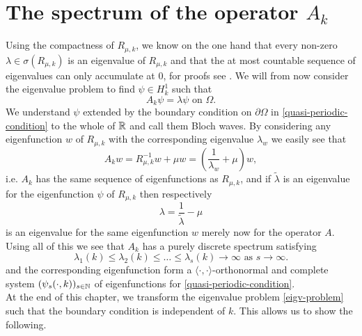 \section{The spectrum of the operator $A_{k}$}	%
Using the compactness of $R_{\mu, k}$, we know on the one hand that every non-zero $\lambda \in \sigma(R_{\mu, k})$ is an eigenvalue of $R_{\mu, k}$ and that the at most countable sequence of eigenvalues can only accumulate at $0$, for proofs see \cite[page 74 - 76]{WeisFA}. We will from now consider the eigenvalue problem to find $\psi \in H^{1}_{k}$ such that
	\begin{equation}
		A_{k} \psi = \lambda \psi \text{ on } \Omega. \label{eigv-problem}
	\end{equation}
We understand $\psi$ extended by the boundary condition on $\partial \Omega$ in \eqref{quasi-periodic-condition} to the whole of $\mathbb{R}$ and call them Bloch waves. By considering any eigenfunction $w$ of $R_{\mu, k}$ with the corresponding eigenvalue $\lambda_{w}$ we easily see that
	\[ A_{k} w = R_{\mu, k}^{-1} w + \mu w = \left(\frac{1}{\lambda_{w}} + \mu\right) w, \]
	i.e. $A_{k}$ has the same sequence of eigenfunctions as $R_{\mu, k}$, and if $\tilde{\lambda}$ is an eigenvalue for the eigenfunction $\psi$ of $R_{\mu, k}$ then respectively
	\[ \lambda = \frac{1}{\tilde{\lambda}} - \mu \]
is an eigenvalue for the same eigenfunction $w$ merely now for the operator $A$. Using all of this we see that $A_{k}$ has a purely discrete spectrum satisfying	
	\[ \lambda_{1}(k) \leq \lambda_{2}(k) \leq \dotsc \leq \lambda_{s}(k) \rightarrow \infty \text{ as } s \rightarrow \infty. \]
and the corresponding eigenfunction form a $\langle \cdot , \cdot \rangle$-orthonormal and complete system $(\psi_{s}(\cdot, k))_{s \in \mathbb{N}}$ of eigenfunctions for \eqref{quasi-periodic-condition}. ~\\

At the end of this chapter, we transform the eigenvalue problem \eqref{eigv-problem} such that the boundary condition is independent of $k$. This allows us to show the following.

